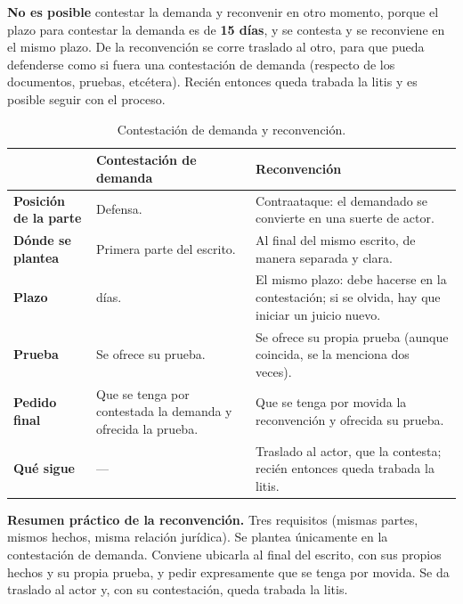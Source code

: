 \documentclass[12pt,oneside]{book}
\begin{document}
\textbf{No es posible} contestar la demanda y reconvenir en otro momento, porque el plazo para contestar la demanda es de \textbf{15 días}, y se contesta y se reconviene en el mismo plazo. De la reconvención se corre traslado al otro, para que pueda defenderse como si fuera una contestación de demanda (respecto de los documentos, pruebas, etcétera). Recién entonces queda trabada la litis y es posible seguir con el proceso.

\begin{table}[H]
\centering
\small
\begin{tabularx}{\textwidth}{>{\raggedright\arraybackslash}p{} >{\raggedright\arraybackslash}X >{\raggedright\arraybackslash}X}
\toprule
 & \textbf{Contestación de demanda} & \textbf{Reconvención} \\
\midrule
\textbf{Posición de la parte} & Defensa. & Contraataque: el demandado se convierte en una suerte de actor. \\
\addlinespace
\textbf{Dónde se plantea} & Primera parte del escrito. & Al final del mismo escrito, de manera separada y clara. \\
\addlinespace
\textbf{Plazo} & 15 días. & El mismo plazo: debe hacerse en la contestación; si se olvida, hay que iniciar un juicio nuevo. \\
\addlinespace
\textbf{Prueba} & Se ofrece su prueba. & Se ofrece su propia prueba (aunque coincida, se la menciona dos veces). \\
\addlinespace
\textbf{Pedido final} & Que se tenga por contestada la demanda y ofrecida la prueba. & Que se tenga por movida la reconvención y ofrecida su prueba. \\
\addlinespace
\textbf{Qué sigue} & --- & Traslado al actor, que la contesta; recién entonces queda trabada la litis. \\
\bottomrule
\end{tabularx}
\caption{Contestación de demanda y reconvención.}
\end{table}

\begin{important}
\textbf{Resumen práctico de la reconvención.} Tres requisitos (mismas partes, mismos hechos, misma relación jurídica). Se plantea únicamente en la contestación de demanda. Conviene ubicarla al final del escrito, con sus propios hechos y su propia prueba, y pedir expresamente que se tenga por movida. Se da traslado al actor y, con su contestación, queda trabada la litis.
\end{important}
\end{document}
